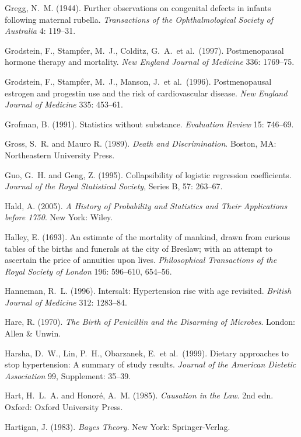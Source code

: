 \smallskip\noindent
Gregg, N.~M. (1944).
Further observations on congenital defects in infants following maternal rubella.
{\it Transactions of the Ophthalmological Society of Australia\/} 4: 119--31.

\smallskip\noindent
Grodstein, F., Stampfer, M.~J., Colditz, G.~A.~et al.~(1997).
Postmenopausal hormone therapy and mortality.
{\it New England Journal of Medicine\/} 336: 1769--75.

\smallskip\noindent
Grodstein, F., Stampfer, M.~J., Manson, J.~et al.~(1996).
Postmenopausal estrogen and progestin use and the risk of cardiovascular disease.
{\it New England Journal of Medicine\/} 335: 453--61.

\smallskip\noindent
Grofman, B. (1991).
Statistics without substance.
{\it Evaluation Review\/} 15: 746--69.

\smallskip\noindent
Gross, S.~R. and  Mauro R. (1989).
{\it Death and Discrimination\/}.
Boston, MA: Northeastern University Press.

\smallskip\noindent
Guo, G.~H. and Geng, Z. (1995).
Collapsibility of logistic regression coefficients.
{\it Journal of the Royal Statistical Society\/}, Series B, {57}: 263--67.

\smallskip\noindent
Hald, A. (2005).
{\it A History of Probability and Statistics and Their Applications before 1750\/}.
New York: Wiley.

\smallskip\noindent
Halley, E. (1693).
An estimate of the mortality of mankind, drawn from curious tables of the births
and funerals at the city of Breslaw;
with an attempt to ascertain the price of annuities upon lives.
{\it Philosophical Transactions of the Royal Society of London\/} 196: 596--610, 654--56.

\smallskip\noindent
Hanneman, R.~L. (1996).
Intersalt: Hypertension rise with age revisited.
{\it British Journal of Medicine\/} 312: 1283--84.

\smallskip\noindent
Hare, R. (1970).
{\it The Birth of Penicillin and the Disarming of Microbes\/}.
London: Allen \& Unwin.

\smallskip\noindent
Harsha, D.~W., Lin, P.~H., Obarzanek, E.~et al.~(1999).
Dietary approaches to stop hypertension: A summary of study results.
{\it Journal of the American Dietetic Association\/} 99, Supplement: 35--39.

\smallskip\noindent
Hart, H.~L.~A. and  Honor\'e, A.~M. (1985).
{\it Causation in the Law\/}. 2nd edn.
Oxford: Oxford University Press.

\smallskip\noindent
Hartigan, J. (1983).
{\it Bayes Theory\/}.
New York: Springer-Verlag.

